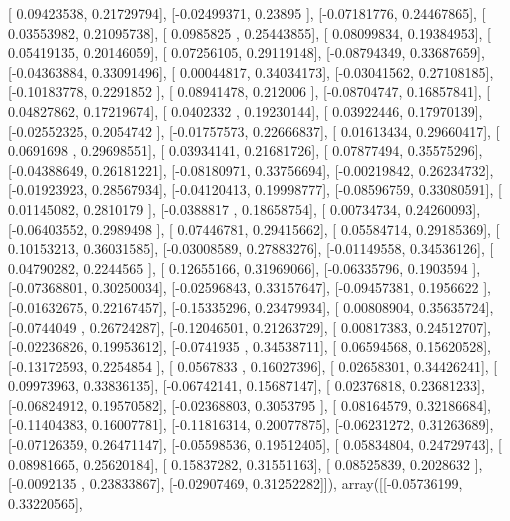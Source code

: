 \documentclass{article}
\begin{document}
       [ 0.09423538,  0.21729794],
       [-0.02499371,  0.23895   ],
       [-0.07181776,  0.24467865],
       [ 0.03553982,  0.21095738],
       [ 0.0985825 ,  0.25443855],
       [ 0.08099834,  0.19384953],
       [ 0.05419135,  0.20146059],
       [ 0.07256105,  0.29119148],
       [-0.08794349,  0.33687659],
       [-0.04363884,  0.33091496],
       [ 0.00044817,  0.34034173],
       [-0.03041562,  0.27108185],
       [-0.10183778,  0.2291852 ],
       [ 0.08941478,  0.212006  ],
       [-0.08704747,  0.16857841],
       [ 0.04827862,  0.17219674],
       [ 0.0402332 ,  0.19230144],
       [ 0.03922446,  0.17970139],
       [-0.02552325,  0.2054742 ],
       [-0.01757573,  0.22666837],
       [ 0.01613434,  0.29660417],
       [ 0.0691698 ,  0.29698551],
       [ 0.03934141,  0.21681726],
       [ 0.07877494,  0.35575296],
       [-0.04388649,  0.26181221],
       [-0.08180971,  0.33756694],
       [-0.00219842,  0.26234732],
       [-0.01923923,  0.28567934],
       [-0.04120413,  0.19998777],
       [-0.08596759,  0.33080591],
       [ 0.01145082,  0.2810179 ],
       [-0.0388817 ,  0.18658754],
       [ 0.00734734,  0.24260093],
       [-0.06403552,  0.2989498 ],
       [ 0.07446781,  0.29415662],
       [ 0.05584714,  0.29185369],
       [ 0.10153213,  0.36031585],
       [-0.03008589,  0.27883276],
       [-0.01149558,  0.34536126],
       [ 0.04790282,  0.2244565 ],
       [ 0.12655166,  0.31969066],
       [-0.06335796,  0.1903594 ],
       [-0.07368801,  0.30250034],
       [-0.02596843,  0.33157647],
       [-0.09457381,  0.1956622 ],
       [-0.01632675,  0.22167457],
       [-0.15335296,  0.23479934],
       [ 0.00808904,  0.35635724],
       [-0.0744049 ,  0.26724287],
       [-0.12046501,  0.21263729],
       [ 0.00817383,  0.24512707],
       [-0.02236826,  0.19953612],
       [-0.0741935 ,  0.34538711],
       [ 0.06594568,  0.15620528],
       [-0.13172593,  0.2254854 ],
       [ 0.0567833 ,  0.16027396],
       [ 0.02658301,  0.34426241],
       [ 0.09973963,  0.33836135],
       [-0.06742141,  0.15687147],
       [ 0.02376818,  0.23681233],
       [-0.06824912,  0.19570582],
       [-0.02368803,  0.3053795 ],
       [ 0.08164579,  0.32186684],
       [-0.11404383,  0.16007781],
       [-0.11816314,  0.20077875],
       [-0.06231272,  0.31263689],
       [-0.07126359,  0.26471147],
       [-0.05598536,  0.19512405],
       [ 0.05834804,  0.24729743],
       [ 0.08981665,  0.25620184],
       [ 0.15837282,  0.31551163],
       [ 0.08525839,  0.2028632 ],
       [-0.0092135 ,  0.23833867],
       [-0.02907469,  0.31252282]]), array([[-0.05736199,  0.33220565],
\end{document}
